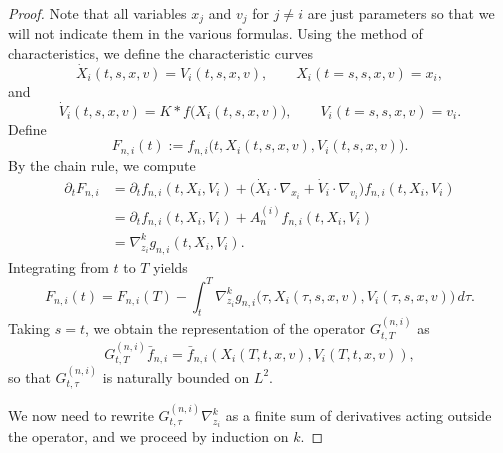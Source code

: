 \documentclass[10pt,a4paper]{amsart}
\begin{document}
\begin{proof}
Note that all variables $x_j$ and $v_j$ for $j\neq i$ are just parameters so that we will not indicate them in the various formulas. Using the method of characteristics, we define the characteristic curves
\[
\dot{X}_i(t,s,x,v) = V_i(t,s,x,v),
\qquad
X_i(t=s,s,x,v)=x_i,
\]
and
\[
\dot{V}_i(t,s,x,v) = K * f \bigl(X_i(t,s,x,v)\bigr),
\qquad
V_i(t=s,s,x,v) = v_i.
\]
Define
\[
F_{n,i}(t) := f_{n,i}\bigl(t, X_i(t,s,x,v), V_i(t,s,x,v)\bigr).
\]
By the chain rule, we compute
\begin{align*}
\partial_t F_{n,i}
&=
\partial_t f_{n,i}(t,X_i,V_i)
+
\bigl(\dot X_i\cdot\nabla_{x_i}
+
\dot V_i\cdot\nabla_{v_i}\bigr)
f_{n,i}(t,X_i,V_i) \\
&=
\partial_t f_{n,i}(t,X_i,V_i)
+
A_n^{(i)} f_{n,i}(t,X_i,V_i) \\
&=
\nabla_{z_i}^k g_{n,i}(t,X_i,V_i).
\end{align*}
Integrating from $t$ to $T$ yields
\[
F_{n,i}(t)
=
F_{n,i}(T)
-
\int_t^T
\nabla_{z_i}^k g_{n,i}\bigl(\tau, X_i(\tau,s,x,v), V_i(\tau,s,x,v)\bigr)\,d\tau.
\]
Taking $s=t$, we obtain the representation of the operator $G^{(n,i)}_{t,T}$ as
\[
G^{(n,i)}_{t,T} \bar f_{n,i}=\bar f_{n,i}(X_i(T,t,x,v),V_i(T,t,x,v)),
\]
so that $G^{(n,i)}_{t,\tau}$ is naturally bounded on $L^2$.

\noindent
We now need to rewrite $G^{(n,i)}_{t,\tau}\nabla_{z_i}^k$ as a finite sum of
derivatives acting outside the operator, and we proceed by induction on $k$.


\end{proof}
\end{document}
